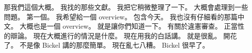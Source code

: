 \hypertarget{w01:cue:392}{}那我們這個大概。
\hypertarget{w01:cue:393}{}我找的那些文獻。
\hypertarget{w01:cue:394}{}我把它稍微整理了一下。
\hypertarget{w01:cue:395}{}大概會處理到一些問題。
\hypertarget{w01:cue:396}{}第一個。
\hypertarget{w01:cue:397}{}我希望給一個 overview。
\hypertarget{w01:cue:398}{}包含今天。
\hypertarget{w01:cue:399}{}我也沒有仔細看的那篇中文。
\hypertarget{w01:cue:400}{}大概也是一個 overview。
\hypertarget{w01:cue:401}{}就是讓你們知道一下。
\hypertarget{w01:cue:402}{}有關於違憲審查。
\hypertarget{w01:cue:403}{}正當性的辯論。
\hypertarget{w01:cue:404}{}現在大概進行的情況是什麼。
\hypertarget{w01:cue:405}{}現在用我的白話講。
\hypertarget{w01:cue:406}{}就是很亂。
\hypertarget{w01:cue:407}{}開花了。
\hypertarget{w01:cue:408}{}不是像 Bickel 講的那麼簡單。
\hypertarget{w01:cue:409}{}現在亂七八糟。
\hypertarget{w01:cue:410}{}Bickel 很早了。

